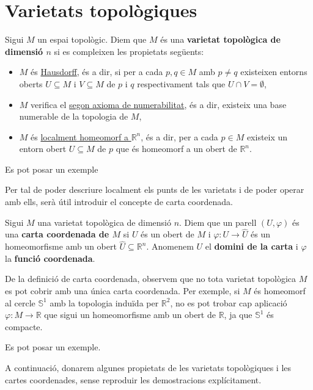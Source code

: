 \section{Varietats topològiques}
\begin{defi} 
    Sigui $M$ un espai topològic. Diem que $M$ és una \textbf{varietat topològica de dimensió $n$} si es compleixen les propietats següents:
    \begin{itemize}
        \item $M$ és \underline{Hausdorff}, és a dir, si per a cada $p,q\in M$ amb $p\neq q$ existeixen entorns oberts $U\subseteq M$ i $V\subseteq M$ de $p$ i $q$ respectivament tals que $U\cap V = \emptyset$,
        \item $M$ verifica el \underline{segon axioma de numerabilitat}, és a dir, existeix una base numerable de la topologia de $M$,
        \item $M$ és \underline{localment homeomorf a $\mathbb R^n$}, és a dir, per a cada $p\in M$ existeix un entorn obert $U\subseteq M$ de $p$ que és homeomorf a un obert de $\mathbb R^n$.
    \end{itemize}
\end{defi}
{\color{blue} Es pot posar un exemple}

Per tal de poder descriure localment els punts de les varietats i de poder operar amb ells, serà útil introduir el concepte de carta coordenada.

\begin{defi}
    Sigui $M$ una varietat topològica de dimensió $n$. Diem que un parell $(U,\varphi)$ és una \textbf{carta coordenada de $M$} si $U$ és un obert de $M$ i $\varphi:U\to\hat U$ és un homeomorfisme amb un obert $\hat U\subseteq\mathbb R^n$. Anomenem $U$ el \textbf{domini de la carta} i $\varphi$ la \textbf{funció coordenada}.
\end{defi}
\begin{obs}
    De la definició de carta coordenada, observem que no tota varietat topològica $M$ es pot cobrir amb una única carta coordenada. Per exemple, si $M$ és homeomorf al cercle $\mathbb S^1$ amb la topologia induïda per $\mathbb R^2$, no es pot trobar cap aplicació $\varphi:M\to\mathbb R$ que sigui un homeomorfisme amb un obert de $\mathbb R$, ja que $\mathbb S^1$ és compacte.
\end{obs}

{\color{blue} Es pot posar un exemple.}

A continuació, donarem algunes propietats de les varietats topològiques i les cartes coordenades, sense reproduir les demostracions explícitament.

